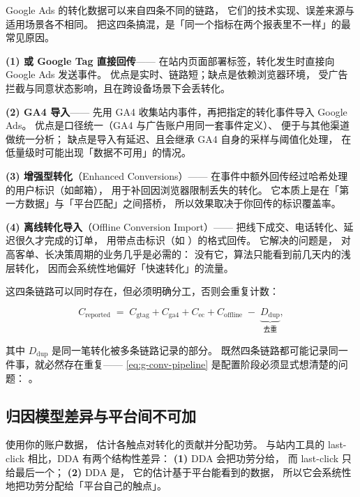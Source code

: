 Google Ads 的转化数据可以来自四条不同的链路，
它们的技术实现、误差来源与适用场景各不相同。
把这四条搞混，是「同一个指标在两个报表里不一样」的最常见原因。

\textbf{(1)  或 Google Tag 直接回传}——
在站内页面部署标签，转化发生时直接向 Google Ads 发送事件。
优点是实时、链路短；缺点是依赖浏览器环境，
受广告拦截与同意状态影响，且在跨设备场景下会丢转化。

\textbf{(2) GA4 导入}——
先用 GA4 收集站内事件，再把指定的转化事件导入 Google Ads。
优点是口径统一（GA4 与广告账户用同一套事件定义）、
便于与其他渠道做统一分析；
缺点是导入有延迟、且会继承 GA4 自身的采样与阈值化处理，
在低量级时可能出现「数据不可用」的情况。

\textbf{(3) 增强型转化}（Enhanced Conversions）——
在事件中额外回传经过哈希处理的用户标识（如邮箱），
用于补回因浏览器限制丢失的转化。
它本质上是在「第一方数据」与「平台匹配」之间搭桥，
所以效果取决于你回传的标识覆盖率。

\textbf{(4) 离线转化导入}（Offline Conversion Import）——
把线下成交、电话转化、延迟很久才完成的订单，
用带点击标识（如 ）的格式回传。
它解决的问题是，
对高客单、长决策周期的业务几乎是必需的：
没有它，算法只能看到前几天内的浅层转化，
因而会系统性地偏好「快速转化」的流量。

这四条链路可以同时存在，但必须明确分工，否则会重复计数：

\begin{equation}
C_{\text{reported}} \;=\; C_{\text{gtag}} + C_{\text{ga4}} + C_{\text{ec}} + C_{\text{offline}}
\;-\; \underbrace{D_{\text{dup}}}_{\text{去重}} ,
\label{eq:g-conv-pipeline}
\end{equation}

其中 $D_{\text{dup}}$ 是同一笔转化被多条链路记录的部分。
既然四条链路都可能记录同一件事，就必然存在重复——
\cref{eq:g-conv-pipeline} 是配置阶段必须显式想清楚的问题：
。

\subsection{归因模型差异与平台间不可加}

 使用你的账户数据，
估计各触点对转化的贡献并分配功劳。
与站内工具的 last-click 相比，DDA 有两个结构性差异：
\textbf{(1)} DDA 会把功劳分给，
而 last-click 只给最后一个；
\textbf{(2)} DDA 是，
它的估计基于平台能看到的数据，
所以它会系统性地把功劳分配给「平台自己的触点」。

